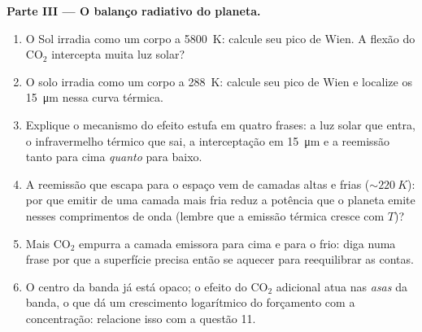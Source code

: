 \begin{problem}
\medskip\noindent\textbf{Parte III --- O balanço radiativo do planeta.}
\begin{enumerate}[resume]
  \item O Sol irradia como um corpo a \qty{5800}{K}: calcule seu pico
        de Wien. A flexão do CO$_2$ intercepta muita luz solar?
  \item O solo irradia como um corpo a \qty{288}{K}: calcule seu pico
        de Wien e localize os \qty{15}{\micro m} nessa curva térmica.
  \item Explique o mecanismo do efeito estufa em quatro frases: a luz
        solar que entra, o infravermelho térmico que sai, a
        interceptação em \qty{15}{\micro m} e a reemissão tanto para
        cima \emph{quanto} para baixo.
  \item A reemissão que escapa para o espaço vem de camadas altas e
        frias ($\sim\qty{220}{K}$): por que emitir de uma camada mais
        fria reduz a potência que o planeta emite nesses comprimentos
        de onda (lembre que a emissão térmica cresce com $T$)?
  \item Mais CO$_2$ empurra a camada emissora para cima e para o frio:
        diga numa frase por que a superfície precisa então se aquecer
        para reequilibrar as contas.
  \item O centro da banda já está opaco; o efeito do CO$_2$ adicional
        atua nas \emph{asas} da banda, o que dá um crescimento
        logarítmico do forçamento com a concentração: relacione isso
        com a questão 11.
\end{enumerate}


\end{problem}
